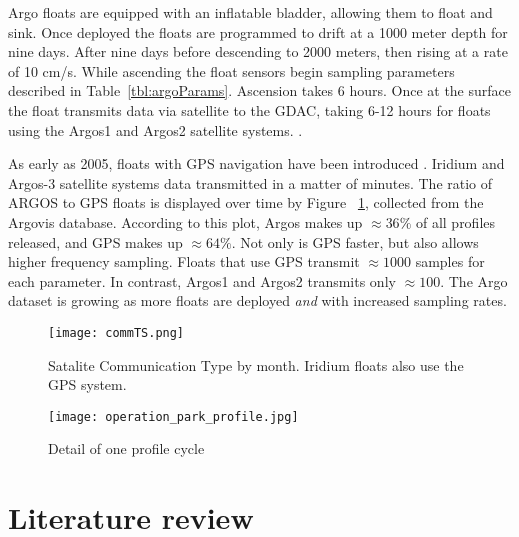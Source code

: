 Argo floats are equipped with an inflatable bladder, allowing them to float and sink. Once deployed the floats are programmed to drift at a 1000 meter depth for nine days. After nine days before descending to 2000 meters, then rising at a rate of 10 cm/s. While ascending the float sensors begin sampling parameters described in Table~\ref{tbl:argoParams}. Ascension takes 6 hours. Once at the surface the float transmits data via satellite to the GDAC, taking 6-12 hours for floats using the Argos1 and Argos2 satellite systems. \cite{argo_uk}.

As early as 2005, floats with GPS navigation have been introduced \cite{argo_man}. Iridium and Argos-3 satellite systems data transmitted in a matter of minutes. The ratio of ARGOS to GPS floats is displayed over time by Figure ~\ref{fig:commTS}, collected from the Argovis database. According to this plot, Argos makes up $\approx 36\%$ of all profiles released, and GPS makes up $\approx 64\%$. Not only is GPS faster, but also allows higher frequency sampling. Floats that use GPS transmit $\approx 1000$ samples for each parameter. In contrast, Argos1 and Argos2 transmits only $\approx 100$. The Argo dataset is growing as more floats are deployed \textit{and} with increased sampling rates.

\begin{figure}[ht]
  \centering
  \begin{minipage}{4.5in}
    \texttt{[image: commTS.png]}
    \caption{ \label{fig:commTS} Satalite Communication Type by month. Iridium floats also use the GPS system.}
  \end{minipage}
\end{figure}

\begin{figure}[ht]
  \centering
  \begin{minipage}{4.5in}
    \texttt{[image: operation\_park\_profile.jpg]}
    \caption{ \label{fig:argo_cycle} Detail of one profile cycle\cite{argo}}
  \end{minipage}
\end{figure}

\section{Literature review}